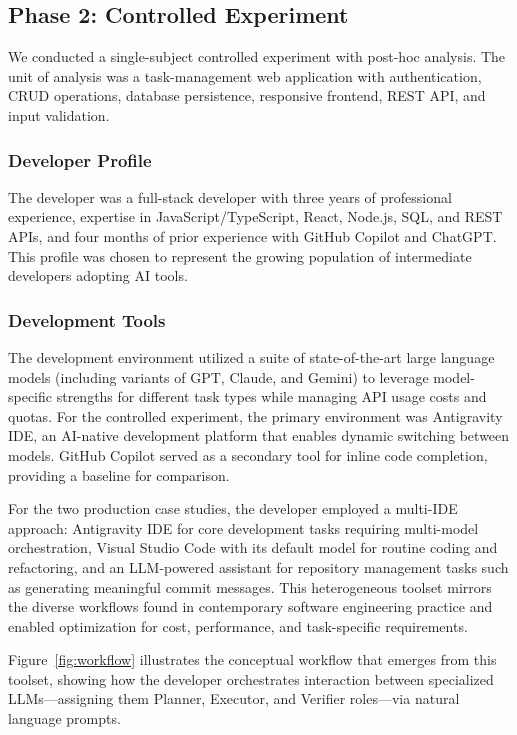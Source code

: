 \documentclass[sigconf]{acmart}
\begin{document}
\subsection{Phase 2: Controlled Experiment}

We conducted a single-subject controlled experiment with post-hoc analysis. The unit of analysis was a task-management web application with authentication, CRUD operations, database persistence, responsive frontend, REST API, and input validation.

\subsubsection{Developer Profile}

The developer was a full-stack developer with three years of professional experience, expertise in JavaScript/TypeScript, React, Node.js, SQL, and REST APIs, and four months of prior experience with GitHub Copilot and ChatGPT. This profile was chosen to represent the growing population of intermediate developers adopting AI tools.

\subsubsection{Development Tools}

The development environment utilized a suite of state-of-the-art large language models (including variants of GPT, Claude, and Gemini) to leverage model-specific strengths for different task types while managing API usage costs and quotas. For the controlled experiment, the primary environment was Antigravity IDE, an AI-native development platform that enables dynamic switching between models. GitHub Copilot served as a secondary tool for inline code completion, providing a baseline for comparison.

For the two production case studies, the developer employed a multi-IDE approach: Antigravity IDE for core development tasks requiring multi-model orchestration, Visual Studio Code with its default model for routine coding and refactoring, and an LLM-powered assistant for repository management tasks such as generating meaningful commit messages. This heterogeneous toolset mirrors the diverse workflows found in contemporary software engineering practice and enabled optimization for cost, performance, and task-specific requirements.

Figure~\ref{fig:workflow} illustrates the conceptual workflow that emerges from this toolset, showing how the developer orchestrates interaction between specialized LLMs—assigning them Planner, Executor, and Verifier roles—via natural language prompts.
\end{document}
